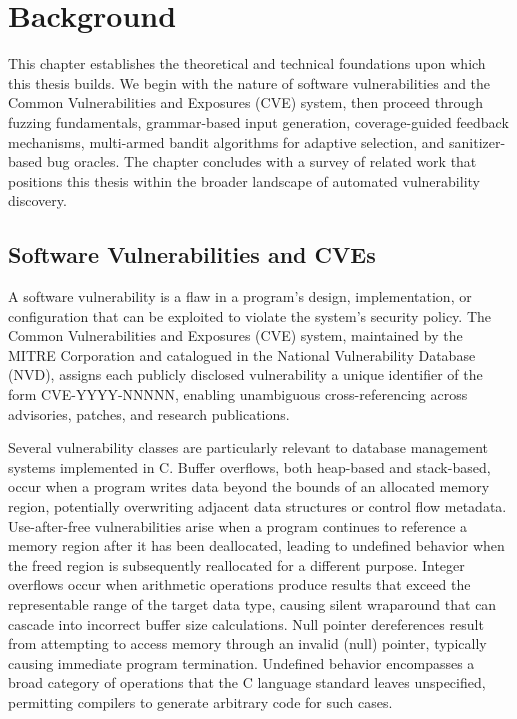 \chapter{Background}
\label{chap:background}

This chapter establishes the theoretical and technical foundations upon which this thesis builds. We begin with the nature of software vulnerabilities and the Common Vulnerabilities and Exposures (CVE) system, then proceed through fuzzing fundamentals, grammar-based input generation, coverage-guided feedback mechanisms, multi-armed bandit algorithms for adaptive selection, and sanitizer-based bug oracles. The chapter concludes with a survey of related work that positions this thesis within the broader landscape of automated vulnerability discovery.

\section{Software Vulnerabilities and CVEs}
\label{sec:bg-vulnerabilities}

A software vulnerability is a flaw in a program's design, implementation, or configuration that can be exploited to violate the system's security policy. The Common Vulnerabilities and Exposures (CVE) system, maintained by the MITRE Corporation and catalogued in the National Vulnerability Database (NVD), assigns each publicly disclosed vulnerability a unique identifier of the form CVE-YYYY-NNNNN, enabling unambiguous cross-referencing across advisories, patches, and research publications.

Several vulnerability classes are particularly relevant to database management systems implemented in C. Buffer overflows, both heap-based and stack-based, occur when a program writes data beyond the bounds of an allocated memory region, potentially overwriting adjacent data structures or control flow metadata. Use-after-free vulnerabilities arise when a program continues to reference a memory region after it has been deallocated, leading to undefined behavior when the freed region is subsequently reallocated for a different purpose. Integer overflows occur when arithmetic operations produce results that exceed the representable range of the target data type, causing silent wraparound that can cascade into incorrect buffer size calculations. Null pointer dereferences result from attempting to access memory through an invalid (null) pointer, typically causing immediate program termination. Undefined behavior encompasses a broad category of operations that the C language standard leaves unspecified, permitting compilers to generate arbitrary code for such cases.

